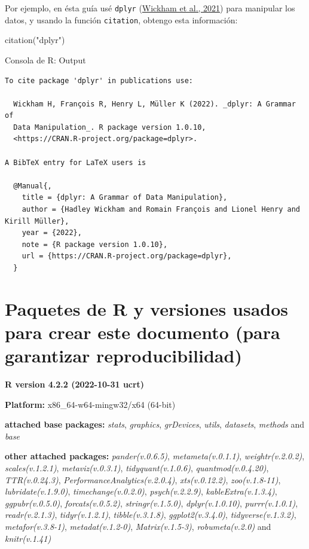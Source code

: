 \documentclass[
  bookmarksnumbered]{article}
\newenvironment{Shaded}{\begin{snugshade}}{\end{snugshade}}
\newcommand{\FunctionTok}[1]{\textcolor[rgb]{0.39,0.29,0.61}{#1}}
\newcommand{\NormalTok}[1]{\textcolor[rgb]{0.12,0.11,0.11}{#1}}
\newcommand{\StringTok}[1]{\textcolor[rgb]{0.75,0.01,0.01}{#1}}
\begin{document}
Por ejemplo, en ésta guía usé \texttt{dplyr} (\protect\hyperlink{ref-WickhamDplyr2021}{Wickham et al., 2021}) para manipular los datos, y usando la función \texttt{citation}, obtengo esta información:

\begin{Shaded}
\begin{Highlighting}[]
\FunctionTok{citation}\NormalTok{(}\StringTok{"dplyr"}\NormalTok{)}
\end{Highlighting}
\end{Shaded}

\begin{ROut}{Consola de R: Output~\thetcbcounter}
                \begin{footnotesize}
                \begin{verbatim} 
To cite package 'dplyr' in publications use:

  Wickham H, François R, Henry L, Müller K (2022). _dplyr: A Grammar of
  Data Manipulation_. R package version 1.0.10,
  <https://CRAN.R-project.org/package=dplyr>.

A BibTeX entry for LaTeX users is

  @Manual{,
    title = {dplyr: A Grammar of Data Manipulation},
    author = {Hadley Wickham and Romain François and Lionel Henry and Kirill Müller},
    year = {2022},
    note = {R package version 1.0.10},
    url = {https://CRAN.R-project.org/package=dplyr},
  }
 \end{verbatim}
                \end{footnotesize}
                \end{ROut}

\hypertarget{paquetes-de-r-y-versiones-usados-para-crear-este-documento-para-garantizar-reproducibilidad}{%
\section{Paquetes de R y versiones usados para crear este documento (para garantizar reproducibilidad)}\label{paquetes-de-r-y-versiones-usados-para-crear-este-documento-para-garantizar-reproducibilidad}}

\textbf{R version 4.2.2 (2022-10-31 ucrt)}

\textbf{Platform:} x86\_64-w64-mingw32/x64 (64-bit)

\textbf{attached base packages:}
\emph{stats}, \emph{graphics}, \emph{grDevices}, \emph{utils}, \emph{datasets}, \emph{methods} and \emph{base}

\textbf{other attached packages:}
\emph{pander(v.0.6.5)}, \emph{metameta(v.0.1.1)}, \emph{weightr(v.2.0.2)}, \emph{scales(v.1.2.1)}, \emph{metaviz(v.0.3.1)}, \emph{tidyquant(v.1.0.6)}, \emph{quantmod(v.0.4.20)}, \emph{TTR(v.0.24.3)}, \emph{PerformanceAnalytics(v.2.0.4)}, \emph{xts(v.0.12.2)}, \emph{zoo(v.1.8-11)}, \emph{lubridate(v.1.9.0)}, \emph{timechange(v.0.2.0)}, \emph{psych(v.2.2.9)}, \emph{kableExtra(v.1.3.4)}, \emph{ggpubr(v.0.5.0)}, \emph{forcats(v.0.5.2)}, \emph{stringr(v.1.5.0)}, \emph{dplyr(v.1.0.10)}, \emph{purrr(v.1.0.1)}, \emph{readr(v.2.1.3)}, \emph{tidyr(v.1.2.1)}, \emph{tibble(v.3.1.8)}, \emph{ggplot2(v.3.4.0)}, \emph{tidyverse(v.1.3.2)}, \emph{metafor(v.3.8-1)}, \emph{metadat(v.1.2-0)}, \emph{Matrix(v.1.5-3)}, \emph{robumeta(v.2.0)} and \emph{knitr(v.1.41)}
\end{document}
